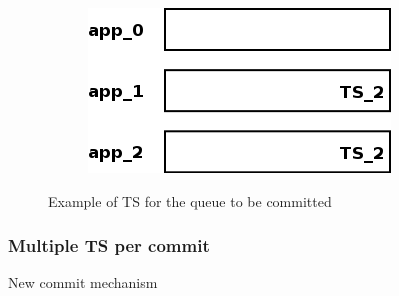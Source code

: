 \begin{figure}
\begin{subfigure}[t]{0.3\textwidth}
    \label{fig:impl_tx_aggr_sub3}
    \caption{}
  \end{subfigure}
  \qquad
  \begin{subfigure}[t]{0.3\textwidth}
    \includegraphics[scale=0.4]{resources/images/Implementation/commit_system_4.png}
    \label{fig:impl_tx_aggr_sub4}
    \caption{}
  \end{subfigure}

  \label{fig:impl_tx_aggr_queue}
  \caption{Example of TS for the queue to be committed}
\end{figure}

\subsubsection{Multiple TS per commit}
\label{sssec:impl_aggr_new}
New commit mechanism